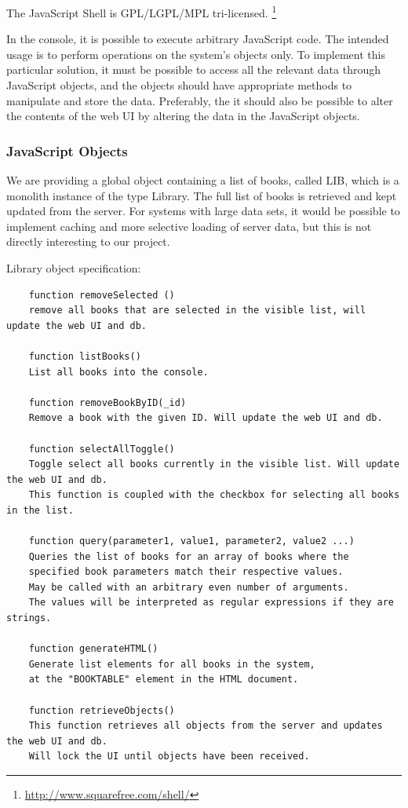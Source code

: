 The JavaScript Shell is GPL/LGPL/MPL tri-licensed. 
\footnote{\url{http://www.squarefree.com/shell/}}

In the console, it is possible to execute arbitrary JavaScript code. The intended usage is to perform operations on the system's objects only. To implement this particular solution, it must be possible to access all the relevant data through JavaScript objects, and the objects should have appropriate methods to manipulate and store the data. Preferably, the it should also be possible to alter the contents of the web UI by altering the data in the JavaScript objects.

\subsubsection{JavaScript Objects}
We are providing a global object containing a list of books, called LIB, which is a monolith instance of the type Library. The full list of books is retrieved and kept updated from the server. For systems with large data sets, it would be possible to implement caching and more selective loading of server data, but this is not directly interesting to our project. 

Library object specification:
\begin{verbatim}
    function removeSelected ()
    remove all books that are selected in the visible list, will update the web UI and db.
    
    function listBooks()
    List all books into the console.
    
    function removeBookByID(_id)
    Remove a book with the given ID. Will update the web UI and db.

    function selectAllToggle()
    Toggle select all books currently in the visible list. Will update the web UI and db.
    This function is coupled with the checkbox for selecting all books in the list.
    
    function query(parameter1, value1, parameter2, value2 ...)
    Queries the list of books for an array of books where the 
    specified book parameters match their respective values.
    May be called with an arbitrary even number of arguments. 
    The values will be interpreted as regular expressions if they are strings.

    function generateHTML()
    Generate list elements for all books in the system, 
    at the "BOOKTABLE" element in the HTML document.
    
    function retrieveObjects()
    This function retrieves all objects from the server and updates the web UI and db. 
    Will lock the UI until objects have been received.

\end{verbatim}


